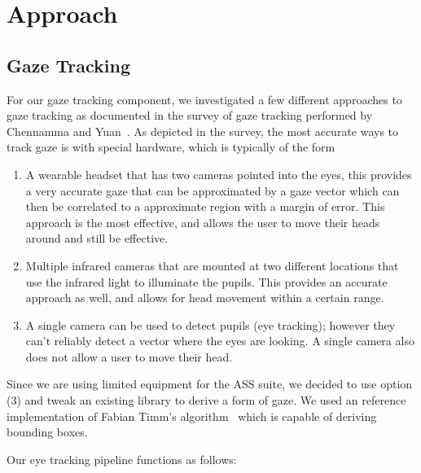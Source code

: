 \section{Approach}

\subsection{Gaze Tracking}

For our gaze tracking component, we investigated a few different approaches to gaze tracking as documented in the survey of gaze tracking performed by Chennamma and Yuan~\cite{chennamma2013survey}. As depicted in the survey, the most accurate ways to track gaze is with special hardware, which is typically of the form 

\begin{enumerate}
    \item A wearable headset that has two cameras pointed into the eyes, this provides a very accurate gaze that can be approximated by a gaze vector which can then be correlated to a approximate region with a margin of error. This approach is the most effective, and allows the user to move their heads around and still be effective. 
    \item Multiple infrared cameras that are mounted at two different locations that use the infrared light to illuminate the pupils. This provides an accurate approach as well, and allows for head movement within a certain range. 
    \item A single camera can be used to detect pupils (eye tracking); however they can't reliably detect a vector where the eyes are looking. A single camera also does not allow a user to move their head.
\end{enumerate}

Since we are using limited equipment for the ASS suite, we decided to use option (3) and tweak an existing library to derive a form of gaze. We used an reference implementation of Fabian Timm's algorithm~\cite{EyeTrackingTIMM} which is capable of deriving bounding boxes. 

Our eye tracking pipeline functions as follows:

